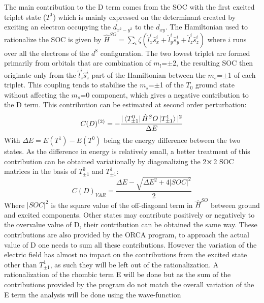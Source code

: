 \documentclass[10pt]{report}
\numberwithin{equation}{section}
\begin{document}
The main contribution to the D term comes from the SOC with the first excited triplet state ($T^1$) which is mainly expressed on the determinant created by exciting an electron occupying the $d_{x^2-y^2}$ to the $d_{xy}$.
The Hamiltonian used to rationalize the SOC is given by $\hat{H}^{SO}=\sum_{i} \zeta(\hat{l}_x^i\hat{s}_x^i+\hat{l}_y^i\hat{s}_y^i+\hat{l}_z^i\hat{s}_z^i)$ where $i$ runs over all the electrons of the $d^8$ configuration.
The two lowest triplet are formed primarily from orbitals that are combination of $m_l$=$\pm$2, the resulting SOC then originate only from the $\hat{l}_z^i\hat{s}_z^i$ part of the Hamiltonian between the $m_s$=$\pm$1 of each triplet.
This coupling tends to stabilise the $m_s$=$\pm$1 of the $T_0$ ground state without affecting the $m_s$=0 component, which gives a negative contribution to the D term.
This contribution can be estimated at second order perturbation:
\begin{equation}\label{ContrPert}
    C(D)^{(2)}=-\frac{|\bra{T^0_{\pm1}}\hat{H}^SO\ket{T^1_{\pm1}}|^2}{\Delta E}
\end{equation}
With $\Delta E = E(T^1)-E(T^0)$ being the energy difference between the two states.
As the difference in energy is relatively small, a better treatment of this contribution can be obtained variationally by diagonalizing the 2$\cross$2 SOC matrices in the basis of $T^0_{\pm1}$ and $T^1_{\pm1}$:
\begin{equation}
    C(D)_{VAR}=\frac{\Delta E -\sqrt{\Delta E^2+4|SOC|^2}}{2}
\end{equation}
Where $|SOC|^2$ is the square value of the off-diagonal term in $\hat{H}^{SO}$ between ground and excited components.
Other states may contribute positively or negatively to the overvalue value of D, their contribution can be obtained the same way. 
These contributions are also provided by the ORCA program, to approach the actual value of D one needs to sum all these contributions.
However the variation of the electric field has almost no impact on the contributions from the excited state other than $T^1_{\pm1}$, as such they will be left out of the rationalization.
A rationalization of the rhombic term E will be done but as the sum of the contributions provided by the program do not match the overall variation of the E term the analysis will be done using the wave-function
\end{document}
